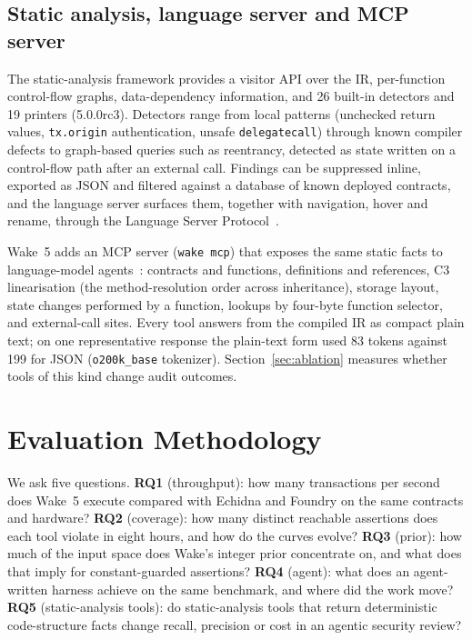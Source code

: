 \documentclass[11pt,a4paper]{article}
\newcommand{\wake}{Wake}
\begin{document}
\subsection{Static analysis, language server and MCP server}
\label{sec:static}

The static-analysis framework provides a visitor API over the IR, per-function control-flow graphs, data-dependency information, and 26 built-in detectors and 19 printers (5.0.0rc3). Detectors range from local patterns (unchecked return values, \texttt{tx.origin} authentication, unsafe \texttt{delegatecall}) through known compiler defects to graph-based queries such as reentrancy, detected as state written on a control-flow path after an external call. Findings can be suppressed inline, exported as JSON and filtered against a database of known deployed contracts, and the language server surfaces them, together with navigation, hover and rename, through the Language Server Protocol~\cite{lsp}.

\wake{}~5 adds an MCP server (\texttt{wake mcp}) that exposes the same static facts to language-model agents~\cite{mcp}: contracts and functions, definitions and references, C3 linearisation (the method-resolution order across inheritance), storage layout, state changes performed by a function, lookups by four-byte function selector, and external-call sites. Every tool answers from the compiled IR as compact plain text; on one representative response the plain-text form used 83 tokens against 199 for JSON (\texttt{o200k\_base} tokenizer). Section~\ref{sec:ablation} measures whether tools of this kind change audit outcomes.

\section{Evaluation Methodology}
\label{sec:method}

We ask five questions.
\textbf{RQ1} (throughput): how many transactions per second does \wake{}~5 execute compared with Echidna and Foundry on the same contracts and hardware?
\textbf{RQ2} (coverage): how many distinct reachable assertions does each tool violate in eight hours, and how do the curves evolve?
\textbf{RQ3} (prior): how much of the input space does \wake{}'s integer prior concentrate on, and what does that imply for constant-guarded assertions?
\textbf{RQ4} (agent): what does an agent-written harness achieve on the same benchmark, and where did the work move?
\textbf{RQ5} (static-analysis tools): do static-analysis tools that return deterministic code-structure facts change recall, precision or cost in an agentic security review?
\end{document}
